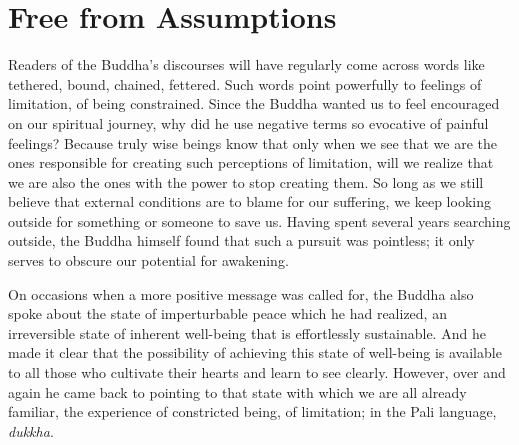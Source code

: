 

\chapter{Free from Assumptions}


Readers of the Buddha’s discourses will have regularly come across words
like tethered, bound, chained,
fettered.\cite{dhp-276}
Such words point powerfully to feelings of limitation, of being constrained. Since the
Buddha wanted us to feel encouraged on our spiritual journey, why did he
use negative terms so evocative of painful feelings? Because truly wise
beings know that only when we see that we are the ones responsible for
creating such perceptions of limitation, will we realize that we are
also the ones with the power to stop creating them. So long as we still
believe that external conditions are to blame for our suffering, we keep
looking outside for something or someone to save us. Having spent
several years searching outside, the Buddha himself found that such a
pursuit was pointless; it only serves to obscure our potential for
awakening.

On occasions when a more positive message was called for, the Buddha
also spoke about the state of imperturbable peace which he had realized,
an irreversible state of inherent well-being that is effortlessly
sustainable. And he made it clear that the possibility of achieving this
state of well-being is available to all those who cultivate their hearts
and learn to see clearly. However, over and again he came back to
pointing to that state with which we are all already familiar, the
experience of constricted being, of limitation; in the Pali language,
\emph{dukkha}.

